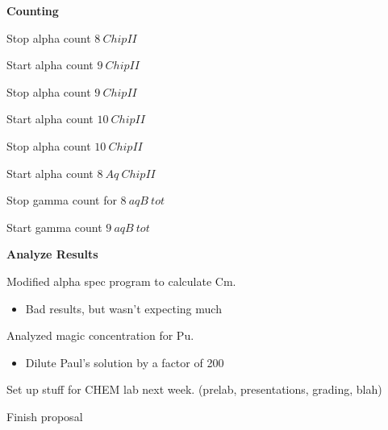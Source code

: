 \documentclass[idxtotoc,hyperref,openany,oneside]{labbook} %
\newcommand{\cmark}{\ding{51}}%
\newcommand{\done}{\rlap{$\square$}{\raisebox{2pt}{\large\hspace{1pt}\cmark}}%
  \hspace{-2.5pt}}
\begin{document}



\textbf{Counting}
\begin{todolist}
\item[\done]{Stop alpha count $\boxed{8\ ChipII}$}
\item[\done]{Start alpha count $\boxed{9\ ChipII}$}
\item[\done]{Stop alpha count $\boxed{9\ ChipII}$}
\item[\done]{Start alpha count $\boxed{10\ ChipII}$}
\item[\done]{Stop alpha count $\boxed{10\ ChipII}$}
\item[\done]{Start alpha count $\boxed{8\ Aq\ ChipII}$}
  
\item[\done]{Stop gamma count for $\boxed{8\ aqB\ tot}$}
\item[\done]{Start gamma count $\boxed{9\ aqB\ tot}$}
\end{todolist}

\textbf{Analyze Results}

\begin{todolist}
\item[\done]{Modified alpha spec program to calculate Cm.}
  \begin{itemize}
  \item{Bad results, but wasn't expecting much}
  \end{itemize}
\item[\done]{Analyzed magic concentration for Pu.}
  \begin{itemize}
  \item{Dilute Paul's solution by a factor of 200}
  \end{itemize}
\end{todolist}


Set up stuff for CHEM lab next week. (prelab, presentations, grading, blah)



Finish proposal
\end{document}
